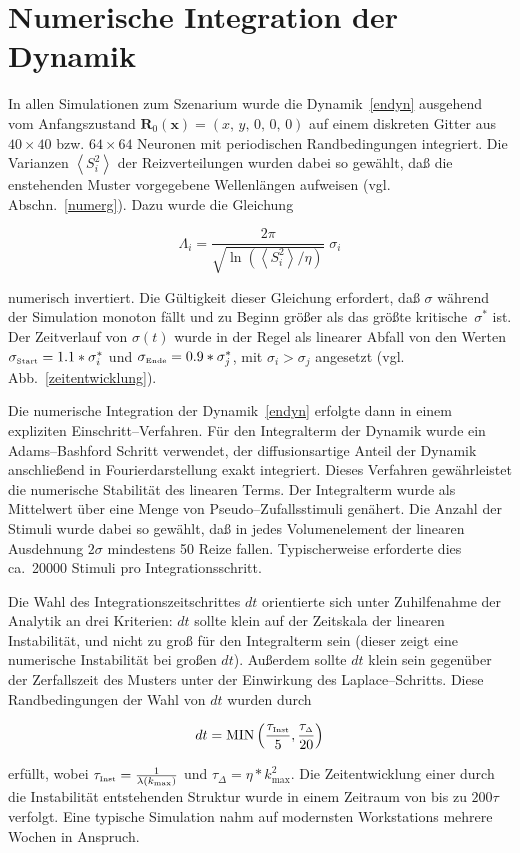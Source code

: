 \section{Numerische Integration der Dynamik}
\label{anhang2}
\thispagestyle{plain}

In allen Simulationen zum Szenarium wurde die Dynamik~\eqref{endyn}
ausgehend vom Anfangszustand $\mathbf{R}_0(\mathbf{x}) = (x,\, y,\, 0,\,
0,\, 0) $ auf einem diskreten Gitter aus $40\times 40$ bzw. $64\times 64$
Neuronen mit periodischen Randbedingungen integriert. Die Varianzen
$\left<S_i^2\right>$ der Reizverteilungen wurden dabei so gewählt, daß
die enstehenden Muster vorgegebene Wellenlängen aufweisen
(vgl. Abschn.~\ref{numerg}). Dazu wurde die Gleichung

\begin{equation*}
    \Lambda_i = \frac{2 \pi}{\sqrt{\ln\left(\left<S_i^2\right>/\eta\right)}}\;\sigma_i
\end{equation*}

\noindent numerisch invertiert. Die Gültigkeit dieser Gleichung
erfordert, daß $\sigma$ während der Simulation monoton fällt und zu
Beginn größer als das größte kritische~$\sigma^\ast$ ist. Der
Zeitverlauf von $\sigma(t)$ wurde in der Regel als linearer Abfall von den
Werten $\sigma_{\mbox{\tiny Start}}=1.1*\sigma_i^\ast$ und
$\sigma_{\mbox{\tiny Ende}}=0.9*\sigma_j^\ast$, mit
$\sigma_i>\sigma_j$ angesetzt (vgl. Abb.~\ref{zeitentwicklung}).

Die numerische Integration der Dynamik~\eqref{endyn} erfolgte dann in einem
expliziten Einschritt--Verfahren. Für den Integralterm der Dynamik wurde
ein Adams--Bashford Schritt verwendet, der diffusionsartige Anteil der
Dynamik anschließend in Fourierdarstellung exakt integriert. Dieses
Verfahren gewährleistet die numerische Stabilität des linearen Terms.
Der Integralterm wurde als Mittelwert über eine Menge von
Pseudo--Zufallsstimuli genähert. Die Anzahl der Stimuli wurde dabei so
gewählt, daß in jedes Volumenelement der linearen Ausdehnung $2\sigma$
mindestens 50 Reize fallen. Typischerweise erforderte dies ca.~20000
Stimuli pro Integrationsschritt.

Die Wahl des Integrationszeitschrittes $dt$ orientierte sich unter
Zuhilfenahme der Analytik an drei Kriterien: $dt$ sollte klein auf der
Zeitskala der linearen Instabilität, und nicht zu groß für den
Integralterm sein (dieser zeigt eine numerische Instabilität bei großen
$dt$). Außerdem sollte $dt$ klein sein gegenüber der Zerfallszeit des
Musters unter der Einwirkung des Laplace--Schritts. Diese Randbedingungen
der Wahl von $dt$ wurden durch

\begin{equation*}
    dt = \text{MIN}\left(\frac{\tau_{\mbox{\tiny
        Inst}}}{5},\frac{\tau_{\scriptscriptstyle \Delta}}{20}\right)
\end{equation*}

\noindent erfüllt, wobei $\tau_{\mbox{\tiny
    Inst}}=\frac{1}{\lambda(k_{\text{max}})}$ und $\tau_{\scriptscriptstyle
    \Delta}=\eta*k_{\text{max}}^2$. Die Zeitentwicklung einer durch die
Instabilität entstehenden Struktur wurde in einem Zeitraum von bis zu
$200\tau$ verfolgt. Eine typische Simulation nahm auf modernsten
Workstations mehrere Wochen in Anspruch.
